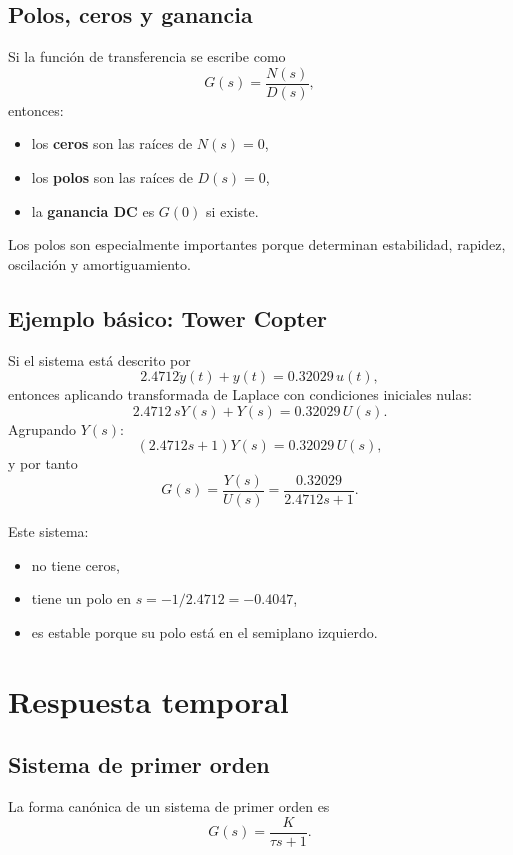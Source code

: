 \documentclass[11pt]{article}
\begin{document}
\subsection{Polos, ceros y ganancia}
Si la funci\'on de transferencia se escribe como
\begin{equation}
G(s)=\frac{N(s)}{D(s)},
\end{equation}
entonces:
\begin{itemize}
\item los \textbf{ceros} son las ra\'ices de $N(s)=0$,
\item los \textbf{polos} son las ra\'ices de $D(s)=0$,
\item la \textbf{ganancia DC} es $G(0)$ si existe.
\end{itemize}

Los polos son especialmente importantes porque determinan estabilidad, rapidez, oscilaci\'on y amortiguamiento.

\subsection{Ejemplo b\'asico: Tower Copter}
Si el sistema est\'a descrito por
\begin{equation}
2.4712\dot{y}(t)+y(t)=0.32029\,u(t),
\end{equation}
entonces aplicando transformada de Laplace con condiciones iniciales nulas:
\[
2.4712\,sY(s)+Y(s)=0.32029\,U(s).
\]
Agrupando $Y(s)$:
\[
(2.4712s+1)Y(s)=0.32029\,U(s),
\]
y por tanto
\begin{equation}
G(s)=\frac{Y(s)}{U(s)}=\frac{0.32029}{2.4712s+1}.
\end{equation}

Este sistema:
\begin{itemize}
\item no tiene ceros,
\item tiene un polo en $s=-1/2.4712=-0.4047$,
\item es estable porque su polo est\'a en el semiplano izquierdo.
\end{itemize}

\section{Respuesta temporal}
\subsection{Sistema de primer orden}
La forma can\'onica de un sistema de primer orden es
\begin{equation}
G(s)=\frac{K}{\tau s+1}.
\end{equation}
\end{document}
